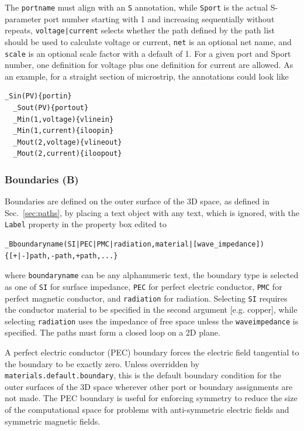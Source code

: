 \documentclass[titlepage]{article}
\renewcommand\_{\textunderscore\linebreak[1]}
\begin{document}
The \texttt{portname} must align with an \texttt{\_S} annotation, while \texttt{Sport} is the actual S-parameter port number starting with 1 and increasing sequentially without repeats, \texttt{voltage|current} selects whether the path defined by the path list should be used to calculate voltage or current, \texttt{net} is an optional net name, and \texttt{scale} is an optional scale factor with a default of 1.  For a given port and Sport number, one definition for voltage plus one definition for current are allowed.  As an example, for a straight section of microstrip, the annotations could look like
\begin{Verbatim}[fontsize=\small]
  _Sin(PV){portin}
  _Sout(PV){portout}
  _Min(1,voltage){vlinein}
  _Min(1,current){iloopin}
  _Mout(2,voltage){vlineout}
  _Mout(2,current){iloopout}
\end{Verbatim}

\subsubsection{Boundaries (\_B)}

Boundaries are defined on the outer surface of the 3D space, as defined in Sec.~\ref{sec:paths}, by placing a text object with any text, which is ignored, with the \texttt{Label} property in the property box edited to
\begin{Verbatim}[fontsize=\small]
  _Bboundaryname(SI|PEC|PMC|radiation,material|[wave_impedance]){[+|-]path,-path,+path,...}
\end{Verbatim}
\noindent where \texttt{boundaryname} can be any alphanumeric text, the boundary type is selected as one of \texttt{SI} for surface impedance, \texttt{PEC} for perfect electric conductor, \texttt{PMC} for perfect magnetic conductor, and \texttt{radiation} for radiation.  Selecting \texttt{SI} requires the conductor material to be specified in the second argument [e.g. copper], while selecting \texttt{radiation} uses the impedance of free space unless the \texttt{wave\_impedance} is specified.  The paths must form a closed loop on a 2D plane.

A perfect electric conductor (PEC) boundary forces the electric field tangential to the boundary to be exactly zero.  Unless overridden by \texttt{materials.default.boundary}, this is the default boundary condition for the outer surfaces of the 3D space wherever other port or boundary assignments are not made.  The PEC boundary is useful for enforcing symmetry to reduce the size of the computational space for problems with anti-symmetric electric fields and symmetric magnetic fields.
\end{document}
